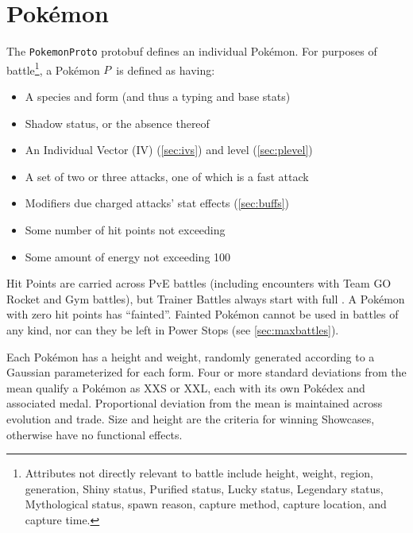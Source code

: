 \chapter{Pokémon\label{chap:pokemon}}
The \texttt{PokemonProto} protobuf defines an individual Pokémon.
For purposes of battle\footnote{Attributes not directly relevant to battle include height, weight, region,
generation, Shiny status, Purified status, Lucky status, Legendary status, Mythological status, spawn
reason, capture method, capture location, and capture time.}, a Pokémon $P$\, is defined as having:
\begin{itemize}
\item A species and form (and thus a typing and base stats)
\item Shadow status, or the absence thereof
\item An Individual Vector (IV) (\autoref{sec:ivs}) and level (\autoref{sec:plevel})
\item A set of two or three attacks, one of which is a fast attack
\item Modifiers due charged attacks' stat effects (\autoref{sec:buffs})
\item Some number of hit points not exceeding \MHP
\item Some amount of energy not exceeding 100
\end{itemize}
Hit Points are carried across PvE battles (including encounters with
  Team GO Rocket and Gym battles), but Trainer Battles always start with full \HP\@.
A Pokémon with zero hit points has ``fainted''.
Fainted Pokémon cannot be used in battles of any kind, nor can they be left in
 Power Stops (see \autoref{sec:maxbattles}).

Each Pokémon has a height and weight, randomly generated according to a Gaussian
 parameterized for each form.
Four or more standard deviations from the mean qualify a Pokémon as XXS or XXL,
 each with its own Pokédex and associated medal.
Proportional deviation from the mean is maintained across evolution and trade.
Size and height are the criteria for winning Showcases, otherwise have no functional effects.

